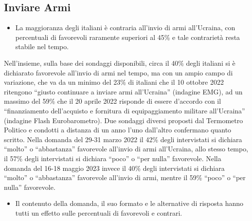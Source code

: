 \documentclass[
]{book}
\providecommand{\tightlist}{%
  \setlength{\itemsep}{0pt}\setlength{\parskip}{0pt}}
\begin{document}
\hypertarget{inviare-armi}{%
\subsection{Inviare Armi}\label{inviare-armi}}

\begin{itemize}
\tightlist
\item
  La maggioranza degli italiani è contraria all'invio di armi all'Ucraina, con percentuali di favorevoli raramente superiori al 45\% e tale contrarietà resta stabile nel tempo.
\end{itemize}

Nell'insieme, sulla base dei sondaggi disponibili, circa il 40\% degli italiani si è dichiarato favorevole all'invio di armi nel tempo, ma con un ampio campo di variazione, che va da un minimo del 23\% di italiani che il 10 ottobre 2022 ritengono ``giusto continuare a inviare armi all'Ucraina'' (indagine EMG), ad un massimo del 59\% che il 20 aprile 2022 risponde di essere d'accordo con il ``finanziamento dell'acquisto e fornitura di equipaggiamento militare all'Ucraina'' (indagine Flash Eurobarometro). Due sondaggi diversi proposti dal Termometro Politico e condotti a distanza di un anno l'uno dall'altro confermano quanto scritto. Nella domanda del 29-31 marzo 2022 il 42\% degli intervistati si dichiara ``molto'' o ``abbastanza'' favorevole all'invio di armi all'Ucraina, allo stesso tempo, il 57\% degli intervistati si dichiara ``poco'' o ``per nulla'' favorevole. Nella domanda del 16-18 maggio 2023 invece il 40\% degli intervistati si dichiara ``molto'' o ``abbastanza'' favorevole all'invio di armi, mentre il 59\% ``poco'' o ``per nulla'' favorevole.

\begin{itemize}
\tightlist
\item
  Il contenuto della domanda, il suo formato e le alternative di risposta hanno tutti un effetto sulle percentuali di favorevoli e contrari.
\end{itemize}
\end{document}
